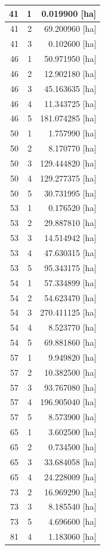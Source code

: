 \documentclass[11pt,]{book}
\begin{document}
\begin{table}
\begin{tabular}[t]{r|r|r}
\hline
41 & 1 & 0.019900 [ha]\\
\hline
41 & 2 & 69.200960 [ha]\\
\hline
41 & 3 & 0.102600 [ha]\\
\hline
46 & 1 & 50.971950 [ha]\\
\hline
46 & 2 & 12.902180 [ha]\\
\hline
46 & 3 & 45.163635 [ha]\\
\hline
46 & 4 & 11.343725 [ha]\\
\hline
46 & 5 & 181.074285 [ha]\\
\hline
50 & 1 & 1.757990 [ha]\\
\hline
50 & 2 & 8.170770 [ha]\\
\hline
50 & 3 & 129.444820 [ha]\\
\hline
50 & 4 & 129.277375 [ha]\\
\hline
50 & 5 & 30.731995 [ha]\\
\hline
53 & 1 & 0.176520 [ha]\\
\hline
53 & 2 & 29.887810 [ha]\\
\hline
53 & 3 & 14.514942 [ha]\\
\hline
53 & 4 & 47.630315 [ha]\\
\hline
53 & 5 & 95.343175 [ha]\\
\hline
54 & 1 & 57.334899 [ha]\\
\hline
54 & 2 & 54.623470 [ha]\\
\hline
54 & 3 & 270.411125 [ha]\\
\hline
54 & 4 & 8.523770 [ha]\\
\hline
54 & 5 & 69.881860 [ha]\\
\hline
57 & 1 & 9.949820 [ha]\\
\hline
57 & 2 & 10.382500 [ha]\\
\hline
57 & 3 & 93.767080 [ha]\\
\hline
57 & 4 & 196.905040 [ha]\\
\hline
57 & 5 & 8.573900 [ha]\\
\hline
65 & 1 & 3.602500 [ha]\\
\hline
65 & 2 & 0.734500 [ha]\\
\hline
65 & 3 & 33.684058 [ha]\\
\hline
65 & 4 & 24.228009 [ha]\\
\hline
73 & 2 & 16.969290 [ha]\\
\hline
73 & 3 & 8.185540 [ha]\\
\hline
73 & 5 & 4.696600 [ha]\\
\hline
81 & 4 & 1.183060 [ha]\\

\end{tabular}
\end{table}
\end{document}
